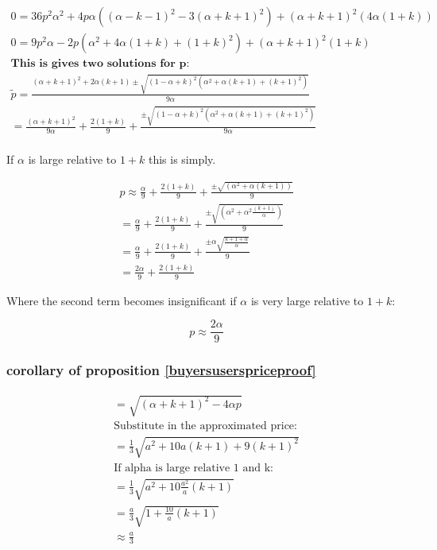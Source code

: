 \documentclass[11pt]{article}
\begin{document}
\begin{align*}
\\
0 = 36 p^2 \alpha^2  +4 p \alpha((\alpha-k-1)^2-3( \alpha+k+1)^2) + ( \alpha+k+1)^2(4 \alpha(1+k))
\\
0 = 9 p^2 \alpha  -2 p (\alpha^2 + 4\alpha(1+k)+(1+k)^2) + ( \alpha+k+1)^2 (1+k)
\\
\textbf{This is gives two solutions for p:} \\
\tilde{p} = \frac{(\alpha+k+1)^2+2\alpha(k+1) \pm \sqrt{(1-\alpha+k)^2(\alpha^2+\alpha (k+1)+(k+1)^2)}}{9 \alpha} \\
 = \frac{(\alpha+k+1)^2}{9 \alpha}+\frac{2(1+k)}{9}+\frac{ \pm \sqrt{(1-\alpha+k)^2(\alpha^2+\alpha (k+1)+(k+1)^2)}}{9 \alpha} \\
\end{align*}

If $\alpha$ is large relative to $1+k$ this is simply. 

\begin{align*}
p \approx \frac{\alpha}{9}+\frac{2(1+k)}{9}+\frac{ \pm \sqrt{(\alpha^2+\alpha (k+1))}}{9 } \\
=\frac{\alpha}{9}+\frac{2(1+k)}{9}+\frac{ \pm \sqrt{(\alpha^2+\alpha^2 \frac{(k+1)}{\alpha})}}{9 } \\
=\frac{\alpha}{9}+\frac{2(1+k)}{9}+\frac{ \pm \alpha \sqrt{ \frac{k+1+\alpha}{\alpha}}}{9} \\
=\frac{2\alpha}{9}+\frac{2(1+k)}{9}
\end{align*}

Where the second term becomes insignificant if $\alpha$ is very large relative to $1+k$:

\begin{equation*}
p \approx \frac{2\alpha}{9}
\end{equation*}

\subsubsection{corollary of proposition 
\ref{buyersuserspriceproof}}
\label{squareroot}

\begin{align*}
=\sqrt{(\alpha+k+1)^2-4 \alpha p} \\
\text{Substitute in the approximated price:} \\
=\frac{1}{3} \sqrt{a^2+10 a (k+1)+9 (k+1)^2} \\
\text{If alpha is large relative 1 and k}: \\
=\frac{1}{3} \sqrt{a^2+10  \frac{a^2}{a} (k+1)} \\
=\frac{a}{3} \sqrt{1+ \frac{10}{a} (k+1)} \\
\approx \frac{a}{3}
\end{align*}
\end{document}
